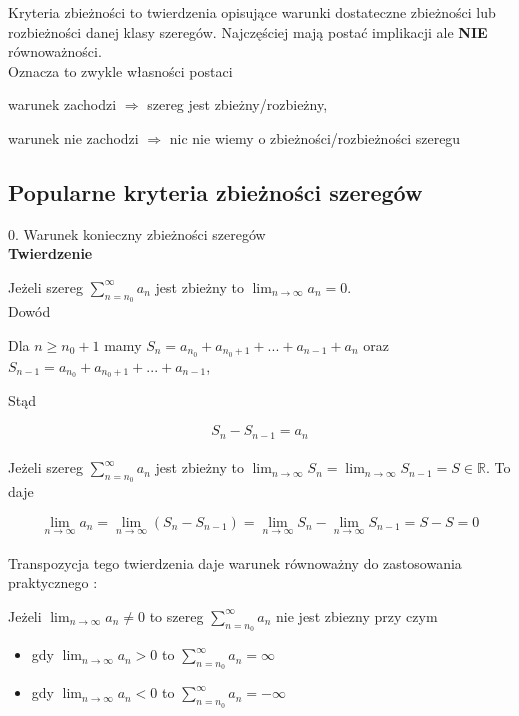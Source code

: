 Kryteria zbieżności to twierdzenia opisujące warunki dostateczne zbieżności lub rozbieżności danej klasy szeregów. Najczęściej mają postać
implikacji ale \textbf{NIE} równoważności. \\

Oznacza to zwykle własności postaci

\quad warunek zachodzi $ \Rightarrow $ szereg jest zbieżny/rozbieżny,

\quad warunek nie zachodzi $\Rightarrow$ nic nie wiemy o zbieżności/rozbieżności szeregu \\

\subsection*{Popularne kryteria zbieżności szeregów}

0. Warunek konieczny zbieżności szeregów \\ 

\textbf{Twierdzenie}

Jeżeli szereg $ \sum\limits_{n = n_0}^{\infty} a_n $ jest zbieżny to $ \lim_{n \to \infty} a_n = 0 $. \\

Dowód 

Dla $ n \geq n_0 + 1 $ mamy $ S_n = a_{n_0} + a_{n_0 + 1} + ... + a_{n - 1} + a_n $ oraz 
$ S_{n - 1} = a_{n_0} + a_{n_0 + 1} + ... + a_{n - 1} $,

Stąd

$$ S_n - S_{n - 1} = a_n $$ \\

Jeżeli szereg $ \sum\limits_{n = n_0}^{\infty} a_n $ jest zbieżny to $ \lim_{n \to \infty} S_n = \lim_{n \to \infty} S_{n - 1} = S \in \mathbb{R} $.
To daje

$$ \lim_{n \to \infty} a_n = \lim_{n \to \infty} (S_n - S_{n - 1}) = \lim_{n \to \infty} S_n - \lim_{n \to \infty} S_{n - 1} = S - S = 0 $$ \\

Transpozycja tego twierdzenia daje warunek równoważny do zastosowania praktycznego :

Jeżeli $ \lim_{n \to \infty} a_n \neq 0 $ to szereg $ \sum\limits_{n = n_0}^{\infty} a_n $ nie jest zbiezny przy czym

\begin{itemize}
    \item gdy $ \lim_{n \to \infty} a_n > 0 $ to $ \sum\limits_{n = n_0}^{\infty} a_n = \infty $
    \item gdy $ \lim_{n \to \infty} a_n < 0 $ to $ \sum\limits_{n = n_0}^{\infty} a_n = -\infty $ 
\end{itemize}

